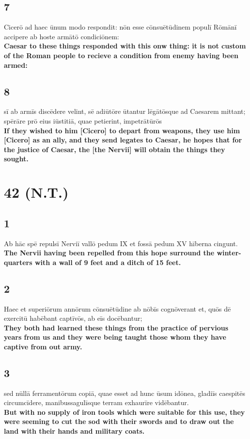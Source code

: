 \documentclass{article}
\begin{document}
\subsection*{7}
Cicerō ad haec ūnum modo respondit: nōn esse cōnsuētūdinem populī Rōmānī accipere ab hoste armātō condiciōnem:\\
\textbf{Caesar to these things responded with this onw thing: it is not custom of the Roman people to recieve a condition from enemy having been armed:}

\subsection*{8}
sī ab armīs discēdere velint, sē adiūtōre ūtantur lēgātōsque ad Caesarem mittant; spērāre prō eius iūstitiā, quae petierint, impetrātūrōs\\
\textbf{If they wished to him [Cicero] to depart from weapons, they use him [Cicero] as an ally, and they send legates to Caesar, he hopes that for the justice of Caesar, the [the Nervii] will obtain the things they sought.}


\section*{42 (N.T.) }

\subsection*{1}
Ab hāc spē repulsī Nerviī vallō pedum IX et fossā pedum XV hīberna cingunt.  \\
\textbf{The Nervii having been repelled from this hope surround the winter-quarters with a wall of 9 feet and a ditch of 15 feet.}

\subsection*{2}
Haec et superiōrum annōrum cōnsuētūdine ab nōbīs cognōverant et, quōs dē exercitū habēbant captīvōs, ab eīs docēbantur;  \\
\textbf{They both had learned these things from the practice of pervious years from us and they were being taught those whom they have captive from out army.}

\subsection*{3}
sed nūllā ferramentōrum copiā, quae esset ad hunc ūsum idōnea, gladiīs caespitēs circumcīdere, manibussagulīsque terram exhaurīre vidēbantur.  \\
\textbf{But with no supply of iron tools which were suitable for this use, they were seeming to cut the sod with their swords and to draw out the land with their hands and military coats.}
\end{document}
